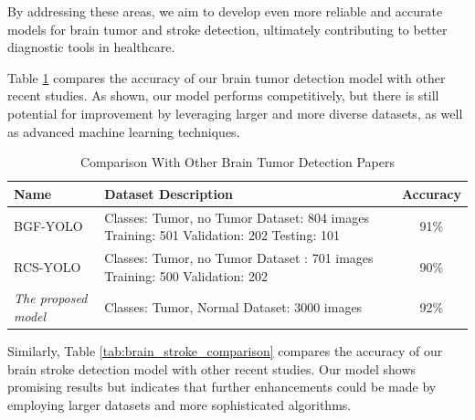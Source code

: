 \documentclass[conference]{IEEEtran}
\begin{document}
By addressing these areas, we aim to develop even more reliable and accurate models for brain tumor and stroke detection, ultimately contributing to better diagnostic tools in healthcare.

Table \ref{tab:brain_tumor_comparison} compares the accuracy of our brain tumor detection model with other recent studies. As shown, our model performs competitively, but there is still potential for improvement by leveraging larger and more diverse datasets, as well as advanced machine learning techniques.

\begin{table}[htbp]
\caption{Comparison With Other Brain Tumor Detection Papers}
\begin{center}
\begin{tabular}{|p{2cm}|p{4cm}|c|}
\hline
\textbf{Name} & \textbf{Dataset Description} & \textbf{Accuracy} \\
\hline
BGF-YOLO \cite{kang2023bgfyolo} & Classes: Tumor, no Tumor \newline Dataset: 804 images \newline Training: 501 \newline Validation: 202 \newline Testing: 101 & 91\% \\
\hline
RCS-YOLO \cite{wong2020yolo7} & Classes: Tumor, no Tumor \newline Dataset \cite{br35h}: 701 images \newline Training: 500 \newline Validation: 202 & 90\% \\
\hline
\emph{The proposed model} & Classes: Tumor, Normal \newline Dataset: 3000 images & 92\% \\
\hline
\end{tabular}
\label{tab:brain_tumor_comparison}
\end{center}
\end{table}

Similarly, Table \ref{tab:brain_stroke_comparison} compares the accuracy of our brain stroke detection model with other recent studies. Our model shows promising results but indicates that further enhancements could be made by employing larger datasets and more sophisticated algorithms.
\end{document}
